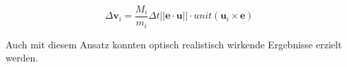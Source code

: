 \begin{equation}
\Delta \textbf{v}_i =  \dfrac{M_i}{m_i} \Delta t ||\textbf{e} \cdot \textbf{u}|| \cdot unit(\textbf{u}_i \times \textbf{e} )
\label{form_momentfinal}
\end{equation}

Auch mit diesem Ansatz konnten optisch realistisch wirkende Ergebnisse erzielt werden.


